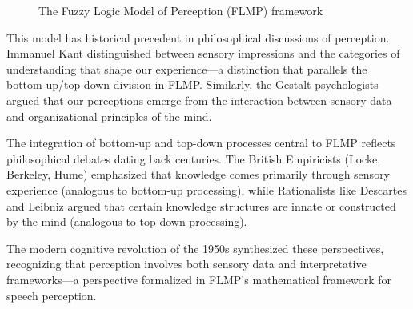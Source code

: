 \documentclass[12pt,a4paper]{article}
\begin{document}
\begin{figure}[h]
\centering
{}
\caption{The Fuzzy Logic Model of Perception (FLMP) framework}
\label{fig:flmp_framework}
\end{figure}

This model has historical precedent in philosophical discussions of perception. Immanuel Kant distinguished between sensory impressions and the categories of understanding that shape our experience—a distinction that parallels the bottom-up/top-down division in FLMP. Similarly, the Gestalt psychologists argued that our perceptions emerge from the interaction between sensory data and organizational principles of the mind.

\begin{tcolorbox}[title=Historical Perspective: From Philosophy to Cognitive Science]
The integration of bottom-up and top-down processes central to FLMP reflects philosophical debates dating back centuries. The British Empiricists (Locke, Berkeley, Hume) emphasized that knowledge comes primarily through sensory experience (analogous to bottom-up processing), while Rationalists like Descartes and Leibniz argued that certain knowledge structures are innate or constructed by the mind (analogous to top-down processing).

The modern cognitive revolution of the 1950s synthesized these perspectives, recognizing that perception involves both sensory data and interpretative frameworks—a perspective formalized in FLMP's mathematical framework for speech perception.
\end{tcolorbox}
\end{document}
